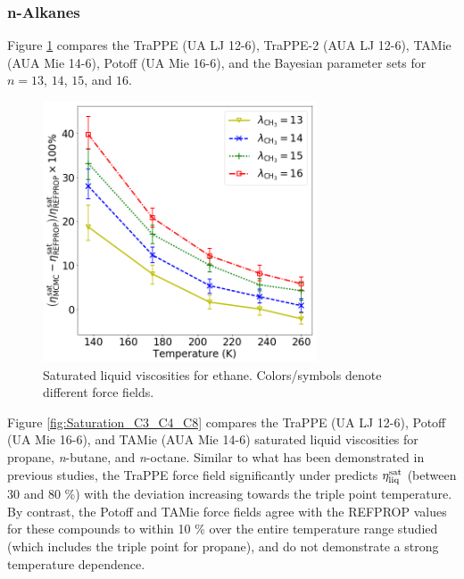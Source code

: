 \documentclass[preprint,review,12pt]{elsarticle}
\begin{document}
	\subsubsection{n-Alkanes}
	
	
	
	Figure \ref{fig:Saturation_Ethane} compares the TraPPE (UA LJ 12-6), TraPPE-2 (AUA LJ 12-6), TAMie (AUA Mie 14-6), Potoff (UA Mie 16-6), and the Bayesian parameter sets for $n = 13$, $14$, $15$, and $16$.
	
	\begin{figure}[htb!]
		\centering
		\includegraphics[width=3.2in]{compare_force_fields_ethane.png}
		\caption{Saturated liquid viscosities for ethane. Colors/symbols denote different force fields.}
		\label{fig:Saturation_Ethane}
	\end{figure} 
	
	Figure \ref{fig:Saturation_C3_C4_C8} compares the TraPPE (UA LJ 12-6), Potoff (UA Mie 16-6), and TAMie (AUA Mie 14-6) saturated liquid viscosities for propane, \textit{n}-butane, and \textit{n}-octane. Similar to what has been demonstrated in previous studies, the TraPPE force field significantly under predicts $\eta_{\rm liq}^{\rm sat}$ (between 30 and 80 \%) with the deviation increasing towards the triple point temperature. By contrast, the Potoff and TAMie force fields agree with the REFPROP values for these compounds to within 10 \% over the entire temperature range studied (which includes the triple point for propane), and do not demonstrate a strong temperature dependence.  
	
\end{document}

